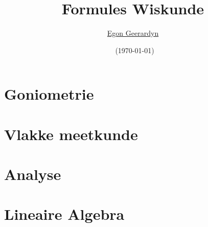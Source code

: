 \documentclass[pdftex,fleqn,a4paper]{article}
\author{\href{mailto:Egon.Geerardyn@vub.ac.be}{Egon Geerardyn}}
\title{Formules Wiskunde}
\date{\revisie\ (\today)}
\newcommand{\revisie}{revisie 3.6}
\begin{document}
  \addtolength{\textwidth}{3cm}
  \maketitlepage
  \newpage
  \setlength{\voffset}{-2cm}

  
   \newpage
   \tableofcontents
   \newpage

 \twocolumn
 \section{Goniometrie}
 \label{sec:Goniometrie}

    
    \onecolumn
    
    
    
    

 \newpage
 \section{Vlakke meetkunde}
 \label{sec:VlakkeMeetkunde}
    
    
    
    


   \newpage
 \section{Analyse}
 \label{sec:Analyse}
   
   
   
   
   
   



 \section{Lineaire Algebra}
 \label{sec:LineaireAlgebra}
   
   
\end{document}
